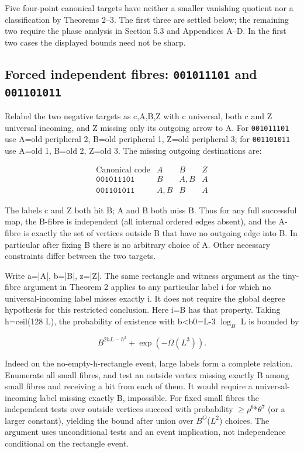 \documentclass[11pt]{article}
\begin{document}
Five four-point canonical targets have neither a smaller vanishing quotient nor a classification by Theorems 2--3. The first three are settled below; the remaining two require the phase analysis in Section 5.3 and Appendices A--D. In the first two cases the displayed bounds need not be sharp.

\subsection{Forced independent fibres: \texttt{001011101} and \texttt{001101011}}

Relabel the two negative targets as c,A,B,Z with c universal, both c and Z universal incoming, and Z missing only its outgoing arrow to A. For \texttt{001011101} use A=old peripheral 2, B=old peripheral 1, Z=old peripheral 3; for \texttt{001101011} use A=old 1, B=old 2, Z=old 3. The missing outgoing destinations are:

\[
\begin{array}{c|ccc}\text{Canonical code}&A&B&Z\\\hline
\texttt{001011101}&B&A,B&A\\
\texttt{001101011}&A,B&B&A\end{array}
\]

The labels c and Z both hit B; A and B both miss B. Thus for any full successful map, the B-fibre is independent (all internal ordered edges absent), and the A-fibre is exactly the set of vertices outside B that have no outgoing edge into B. In particular after fixing B there is no arbitrary choice of A. Other necessary constraints differ between the two targets.

Write a=|A|, b=|B|, z=|Z|. The same rectangle and witness argument as the tiny-fibre argument in Theorem 2 applies to any particular label i for which no universal-incoming label misses exactly i. It does not require the global degree hypothesis for this restricted conclusion. Here i=B has that property. Taking h=ceil(128 L), the probability of existence with b<b0=L-3 $\log_B$ L is bounded by

\[
B^{2hL-h^2}+\exp(-\Omega(L^3)).
\]

Indeed on the no-empty-h-rectangle event, large labels form a complete relation. Enumerate all small fibres, and test an outside vertex missing exactly B among small fibres and receiving a hit from each of them. It would require a universal-incoming label missing exactly B, impossible. For fixed small fibres the independent tests over outside vertices succeed with probability \ensuremath{\geq}$\rho^{b}$*$\theta^{7}$ (or a larger constant), yielding the bound after union over $B^{O}$($L^{2}$) choices. The argument uses unconditional tests and an event implication, not independence conditional on the rectangle event.
\end{document}
